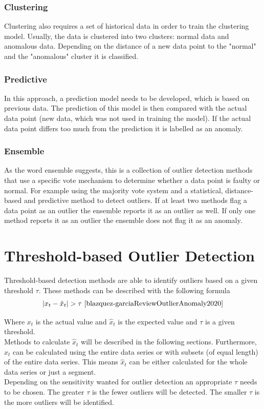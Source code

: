 \subsubsection{Clustering}
Clustering also requires a set of historical data in order to train the clustering model. Usually, the data is clustered into two clusters: normal data and anomalous data. Depending on the distance of a new data point to the "normal" and the "anomalous" cluster it is classified.
\cite{cookAnomalyDetectionIoT2020, giannoniAnomalyDetectionModels2018, chandolaAnomalyDetectionSurvey2009}
\subsubsection{Predictive}
In this approach, a prediction model needs to be developed,  which is based on previous data. The prediction of this model is then compared with the actual data point (new data, which was not used in training the model). If the actual data point differs too much from the prediction it is labelled as an anomaly. \cite{cookAnomalyDetectionIoT2020, giannoniAnomalyDetectionModels2018}


\subsubsection{Ensemble}
As the word ensemble suggests, this is a collection of outlier detection methods that use a specific vote mechanism to determine whether a data point is faulty or normal. For example using the majority vote system and a statistical, distance-based and predictive method to detect outliers. If at least two methods flag a data point as an outlier the ensemble reports it as an outlier as well. If only one method reports it as an outlier the ensemble does not flag it as an anomaly.
\cite{cookAnomalyDetectionIoT2020}

\section{Threshold-based Outlier Detection}\label{section:threshold-based-outlier-detection}
Threshold-based detection methods are able to identify outliers based on a given threshold $\tau$. These methods can be described with the following formula
\begin{equation}
  |x_t - \hat{x}_t | > \tau \text{ \cite{blazquez-garciaReviewOutlierAnomaly2020}}
\end{equation}

Where $x_t$ is the actual value and $\hat{x}_t$ is the expected value and $\tau$ is a given threshold.\\
Methods to calculate $\hat{x}_t$ will be described in the following sections. Furthermore, $\hat{x}_t$ can be calculated using the entire data series or with subsets (of equal length) of the entire data series. This means $\hat{x}_t$ can be either calculated for the whole data series or just a segment.\\
Depending on the sensitivity wanted for outlier detection an appropriate $\tau$ needs to be chosen. The greater $\tau$ is the fewer outliers will be detected. The smaller $\tau$ is the more outliers will be identified.  \cite{blazquez-garciaReviewOutlierAnomaly2020}

